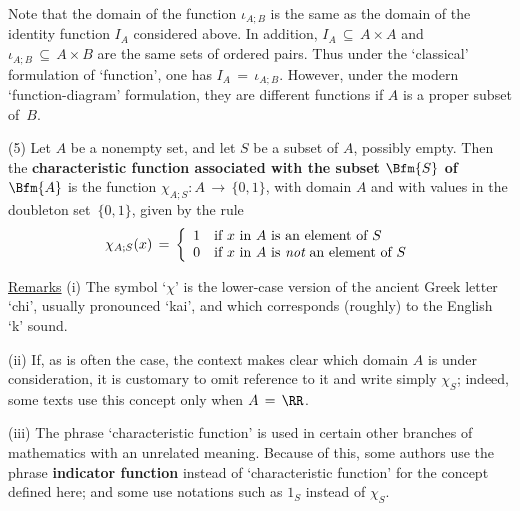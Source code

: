         Note that the domain of the function ${\iota}_{A;B}$ is the same as the domain of the identity function $I_{A}$ considered above.
    In addition, $I_{A} \,{\subseteq}\, A{\times}A$ and ${\iota}_{A;B} \,{\subseteq}\, A{\times}B$ are the same sets of ordered pairs.
    Thus under the `classical' formulation of `function', one has $I_{A} \,=\, {\iota}_{A;B}$.
    However, under the modern `function-diagram' formulation, they are different functions if $A$ is a proper subset of~$B$.

\V

        (5) Let $A$ be a nonempty set, and let $S$ be a subset of $A$, possibly empty.
    Then the {\bf characteristic function associated with the subset $\Bfm{S}$ of $\Bfm{A}$} is the function ${\chi}_{A;S}:A \,{\rightarrow}\, \{0,1\}$, with domain $A$ and with values in the doubleton set~$\{0,1\}$,
    given by the rule
        \begin{displaymath}
        {\chi}_{A;S}(x) \,=\, \left\{
        \begin{array}{ll}
        1 & \mbox{if $x$ in $A$ is an element of $S$}           \\
        0 & \mbox{if $x$ in $A$ is {\em not} an element of $S$}
        \end{array}
        \right.
        \end{displaymath}

        \underline{Remarks} (i) The symbol `${\chi}$' is the lower-case version of the ancient Greek letter `chi', usually pronounced `kai', and which corresponds (roughly) to the English `k' sound.


        (ii) If, as is often the case, the context makes clear which domain $A$ is under consideration, it is customary to omit reference to it and write simply ${\chi}_{S}$; indeed, some texts use this concept only when $A \,=\, {\RR}$.

        (iii) The phrase `characteristic function' is used in certain other branches of mathematics with an unrelated meaning.
    Because of this, some authors use the phrase {\bf indicator function}
    instead of `characteristic function' for the concept defined here; and some use notations such as $1_{S}$ instead of ${\chi}_{S}$.

\V

